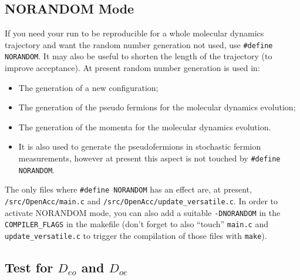 \documentclass[a4paper,10pt]{book}
\begin{document}
  \subsection{ NORANDOM Mode}
  If you need your run to be reproducible for a whole molecular dynamics 
trajectory and want the random number generation not used, use 
\verb|#define NORANDOM|. It may also be useful to shorten the length of the 
trajectory (to improve acceptance).
At present random number generation is used in:
\begin{itemize}
 \item The generation of a new configuration;
 \item The generation of the pseudo fermions for the molecular dynamics 
evolution;
 \item The generation of the momenta for the molecular dynamics evolution.
 \item It is also used to generate the pseudofermions in stochastic fermion 
measurements, however at present this aspect is not touched by 
\verb|#define NORANDOM|.
\end{itemize}
The only files where \verb|#define NORANDOM| has an effect are, at present, 
\verb|/src/OpenAcc/main.c| and \verb|/src/OpenAcc/update_versatile.c|. In order 
to activate NORANDOM mode, you can also add a suitable \verb|-DNORANDOM| in the 
\verb|COMPILER_FLAGS| in the makefile (don't forget to also ``touch'' 
\verb|main.c| and \verb|update_versatile.c| to trigger the compilation of those 
files with \verb|make|).

\subsection{Test for $D_{eo}$ and $D_{oe}$}
\end{document}
